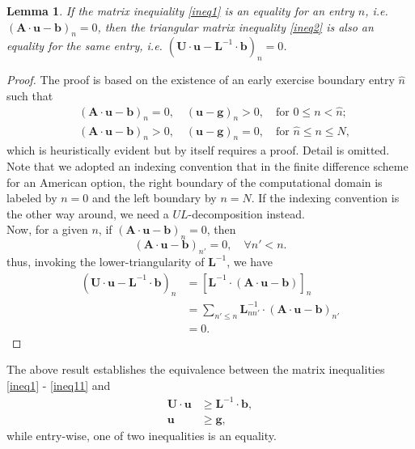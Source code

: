 \documentclass[paper=a4, fontsize=10pt,]{scrartcl} %
\newtheorem{lemma}[theorem]{Lemma}
\theoremstyle{theorem}
\theoremstyle{remark}
\theoremstyle{example}
\numberwithin{equation}{section} %
\numberwithin{figure}{section} %
\numberwithin{table}{section} %
\begin{document}
\begin{lemma}
If the matrix inequiality \ref{ineq1} is an equality for an entry $n$, i.e. $(\mathbf{A}\cdot\mathbf{u} - \mathbf{b})_n=0$, then the
triangular matrix inequality \ref{ineq2} is also an equality for the same entry, i.e. $(\mathbf{U}\cdot\mathbf{u} - \mathbf{L}^{-1}\cdot\mathbf{b})_n
=0$.
\end{lemma}
\begin{proof}
The proof is based on the existence of an early exercise boundary entry $\hat{n}$ such that
\begin{align*}
&(\mathbf{A}\cdot\mathbf{u} - \mathbf{b})_n=0, \quad (\mathbf{u} - \mathbf{g})_n>0, \quad \text{for } 0\le n < \hat{n};\\
&(\mathbf{A}\cdot\mathbf{u} - \mathbf{b})_n>0, \quad (\mathbf{u} - \mathbf{g})_n=0, \quad \text{for } \hat{n}\le n\le N,
\end{align*}
which is heuristically evident but by itself requires a proof. Detail is omitted. Note that we adopted an indexing convention that in the finite difference
scheme for an American option, the right boundary of the computational domain is labeled by $n=0$ and the left boundary by $n=N$.
If the indexing convention is the other way around, we need a $UL$-decomposition instead.\\

Now, for a given $n$, if  $(\mathbf{A}\cdot\mathbf{u} - \mathbf{b})_n=0$, then
$$
(\mathbf{A}\cdot\mathbf{u} - \mathbf{b})_{n'}=0, \quad \forall n'<n.
$$
thus, invoking the lower-triangularity of $\mathbf{L}^{-1}$, we have
\begin{align*}
(\mathbf{U}\cdot\mathbf{u} - \mathbf{L}^{-1}\cdot\mathbf{b})_n &= \left[\mathbf{L}^{-1} \cdot(\mathbf{A}\cdot \mathbf{u} - \mathbf{b})\right]_n\\
&= \sum_{n'\le n}\mathbf{L}^{-1}_{nn'} \cdot(\mathbf{A}\cdot \mathbf{u} - \mathbf{b})_{n'}\\
&= 0.
\end{align*}
\end{proof}
The above result establishes the equivalence between the matrix inequalities \ref{ineq1} - \ref{ineq11} and
\begin{align*}
\mathbf{U}\cdot\mathbf{u} &\ge \mathbf{L}^{-1}\cdot \mathbf{b}, \\
\mathbf{u} &\ge \mathbf{g},
\end{align*}
while entry-wise, one of two inequalities is an equality.
\end{document}
